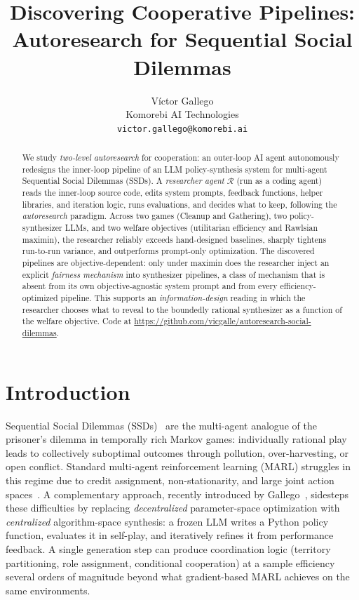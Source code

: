 \documentclass{article}
\title{Discovering Cooperative Pipelines: Autoresearch for Sequential Social Dilemmas}
\author{%
  Víctor Gallego \\
  Komorebi AI Technologies\\
  \texttt{victor.gallego@komorebi.ai} \\
}
\newcommand{\cR}{\mathcal{R}}
\begin{document}
\maketitle


\begin{abstract}
  We study \emph{two-level autoresearch} for cooperation: an outer-loop AI agent autonomously redesigns the inner-loop pipeline of an LLM policy-synthesis system for multi-agent Sequential Social Dilemmas (SSDs). A \emph{researcher agent} $\cR$ (run as a coding agent) reads the inner-loop source code, edits system prompts, feedback functions, helper libraries, and iteration logic, runs evaluations, and decides what to keep, following the \emph{autoresearch} paradigm. Across two games (Cleanup and Gathering), two policy-synthesizer LLMs, and two welfare objectives (utilitarian efficiency and Rawlsian maximin), the researcher reliably exceeds hand-designed baselines, sharply tightens run-to-run variance, and outperforms prompt-only optimization. The discovered pipelines are objective-dependent: only under maximin does the researcher inject an explicit \emph{fairness mechanism} into synthesizer pipelines, a class of mechanism that is absent from its own objective-agnostic system prompt and from every efficiency-optimized pipeline. This supports an \emph{information-design} reading in which the researcher chooses what to reveal to the boundedly rational synthesizer as a function of the welfare objective. Code at \url{https://github.com/vicgalle/autoresearch-social-dilemmas}.
\end{abstract}


\section{Introduction}

Sequential Social Dilemmas (SSDs)~\cite{leibo2017} are the multi-agent analogue of the prisoner's dilemma in temporally rich Markov games: individually rational play leads to collectively suboptimal outcomes through pollution, over-harvesting, or open conflict. Standard multi-agent reinforcement learning (MARL) struggles in this regime due to credit assignment, non-stationarity, and large joint action spaces~\cite{busoniu2008}. A complementary approach, recently introduced by Gallego~\cite{gallego2026}, sidesteps these difficulties by replacing \emph{decentralized} parameter-space optimization with \emph{centralized} algorithm-space synthesis: a frozen LLM writes a Python policy function, evaluates it in self-play, and iteratively refines it from performance feedback. A single generation step can produce coordination logic (territory partitioning, role assignment, conditional cooperation) at a sample efficiency several orders of magnitude beyond what gradient-based MARL achieves on the same environments.
\end{document}

